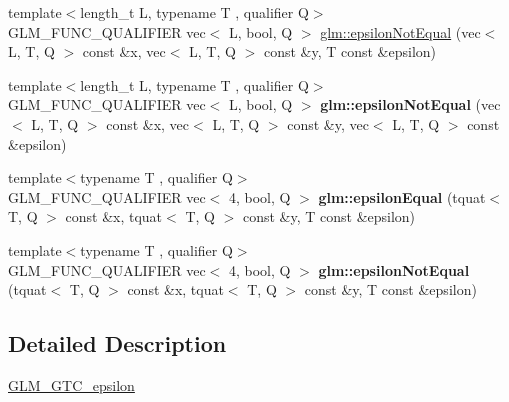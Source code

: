 \begin{DoxyCompactItemize}
\item 
{\footnotesize template$<$length\+\_\+t L, typename T , qualifier Q$>$ }\\G\+L\+M\+\_\+\+F\+U\+N\+C\+\_\+\+Q\+U\+A\+L\+I\+F\+I\+ER vec$<$ L, bool, Q $>$ \hyperlink{group__gtc__epsilon_gaf840d33b9a5261ec78dcd5125743b025}{glm\+::epsilon\+Not\+Equal} (vec$<$ L, T, Q $>$ const \&x, vec$<$ L, T, Q $>$ const \&y, T const \&epsilon)
\item 
\mbox{\label{epsilon_8inl_a74221cd9d4ae4bf14a94b9fd781e4d78}} 
{\footnotesize template$<$length\+\_\+t L, typename T , qualifier Q$>$ }\\G\+L\+M\+\_\+\+F\+U\+N\+C\+\_\+\+Q\+U\+A\+L\+I\+F\+I\+ER vec$<$ L, bool, Q $>$ {\bfseries glm\+::epsilon\+Not\+Equal} (vec$<$ L, T, Q $>$ const \&x, vec$<$ L, T, Q $>$ const \&y, vec$<$ L, T, Q $>$ const \&epsilon)
\item 
\mbox{\label{epsilon_8inl_aace7d888eddc231974f670d0f5c11873}} 
{\footnotesize template$<$typename T , qualifier Q$>$ }\\G\+L\+M\+\_\+\+F\+U\+N\+C\+\_\+\+Q\+U\+A\+L\+I\+F\+I\+ER vec$<$ 4, bool, Q $>$ {\bfseries glm\+::epsilon\+Equal} (tquat$<$ T, Q $>$ const \&x, tquat$<$ T, Q $>$ const \&y, T const \&epsilon)
\item 
\mbox{\label{epsilon_8inl_a0feea019d5228d3fdab3b21a7cd32dcd}} 
{\footnotesize template$<$typename T , qualifier Q$>$ }\\G\+L\+M\+\_\+\+F\+U\+N\+C\+\_\+\+Q\+U\+A\+L\+I\+F\+I\+ER vec$<$ 4, bool, Q $>$ {\bfseries glm\+::epsilon\+Not\+Equal} (tquat$<$ T, Q $>$ const \&x, tquat$<$ T, Q $>$ const \&y, T const \&epsilon)
\end{DoxyCompactItemize}


\subsection{Detailed Description}
\hyperlink{group__gtc__epsilon}{G\+L\+M\+\_\+\+G\+T\+C\+\_\+epsilon} 